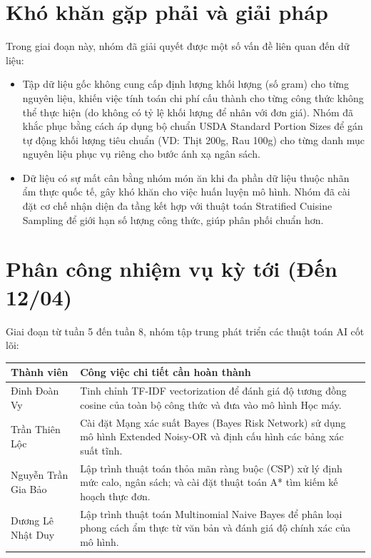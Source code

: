 \documentclass[a4paper, 12pt]{article}
\begin{document}
\section{Khó khăn gặp phải và giải pháp}
Trong giai đoạn này, nhóm đã giải quyết được một số vấn đề liên quan đến dữ liệu:
\begin{itemize}
    \item Tập dữ liệu gốc không cung cấp định lượng khối lượng (số gram) cho từng nguyên liệu, khiến việc tính toán chi phí cấu thành cho từng công thức không thể thực hiện (do không có tỷ lệ khối lượng để nhân với đơn giá). Nhóm đã khắc phục bằng cách áp dụng bộ chuẩn USDA Standard Portion Sizes để gán tự động khối lượng tiêu chuẩn (VD: Thịt 200g, Rau 100g) cho từng danh mục nguyên liệu phục vụ riêng cho bước ánh xạ ngân sách.
    \item Dữ liệu có sự mất cân bằng nhóm món ăn khi đa phần dữ liệu thuộc nhãn ẩm thực quốc tế, gây khó khăn cho việc huấn luyện mô hình. Nhóm đã cài đặt cơ chế nhận diện đa tầng kết hợp với thuật toán Stratified Cuisine Sampling để giới hạn số lượng công thức, giúp phân phối chuẩn hơn.
\end{itemize}

\section{Phân công nhiệm vụ kỳ tới (Đến 12/04)}
Giai đoạn từ tuần 5 đến tuần 8, nhóm tập trung phát triển các thuật toán AI cốt lõi:
\begin{table}[h!]
    \centering
    \renewcommand{\arraystretch}{1.3}
    \begin{tabularx}{\textwidth}{|p{4.5cm}|X|}
        \hline
        \textbf{Thành viên} & \textbf{Công việc chi tiết cần hoàn thành} \\
        \hline
        Đinh Đoàn Vy  & Tinh chỉnh TF-IDF vectorization để đánh giá độ tương đồng cosine của toàn bộ công thức và đưa vào mô hình Học máy. \\
        \hline
        Trần Thiên Lộc & Cài đặt Mạng xác suất Bayes (Bayes Risk Network) sử dụng mô hình Extended Noisy-OR và định cấu hình các bảng xác suất tĩnh. \\
        \hline
        Nguyễn Trần Gia Bảo & Lập trình thuật toán thỏa mãn ràng buộc (CSP) xử lý định mức calo, ngân sách; và cài đặt thuật toán A* tìm kiếm kế hoạch thực đơn. \\
        \hline
        Dương Lê Nhật Duy  & Lập trình thuật toán Multinomial Naive Bayes để phân loại phong cách ẩm thực từ văn bản và đánh giá độ chính xác của mô hình. \\
        \hline
    \end{tabularx}
\end{table}
\end{document}
